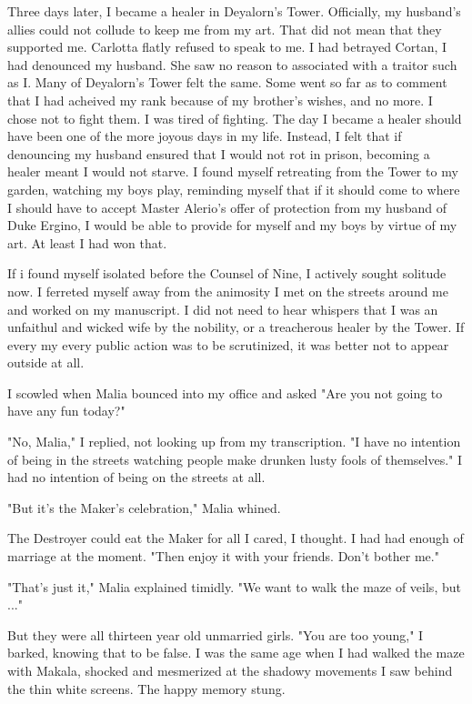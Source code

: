 \documentclass{article}
\begin{document}
Three days later, I became a healer in Deyalorn's Tower. Officially, my husband's allies could not collude to keep me from my art. That did not mean that they supported me. Carlotta flatly refused to speak to me. I had betrayed Cortan, I had denounced my husband. She saw no reason to associated with a traitor such as I. Many of Deyalorn's Tower felt the same. Some went so far as to comment that I had acheived my rank because of my brother's wishes, and no more. I chose not to fight them. I was tired of fighting. The day I became a healer should have been one of the more joyous days in my life. Instead, I felt that if denouncing my husband ensured that I would not rot in prison, becoming a healer meant I would not starve. I found myself retreating from the Tower to my garden, watching my boys play, reminding myself that if it should come to where I should have to accept Master Alerio's offer of protection from my husband of Duke Ergino, I would be able to provide for myself and my boys by virtue of my art. At least I had won that.

If i found myself isolated before the Counsel of Nine, I actively sought solitude now. I ferreted myself away from the animosity I met on the streets around me and worked on my manuscript. I did not need to hear whispers that I was an unfaithul and wicked wife by the nobility, or a treacherous healer by the Tower. If every my every public action was to be scrutinized, it was better not to appear outside at all.

I scowled when Malia bounced into my office and asked "Are you not going to have any fun today?"

"No, Malia," I replied, not looking up from my transcription. "I have no intention of being in the streets watching people make drunken lusty fools of themselves." I had no intention of being on the streets at all.

"But it's the Maker's celebration," Malia whined.

The Destroyer could eat the Maker for all I cared, I thought. I had had enough of marriage at the moment. "Then enjoy it with your friends. Don't bother me." 

"That's just it," Malia explained timidly. "We want to walk the maze of veils, but ..."

But they were all thirteen year old unmarried girls. "You are too young," I barked, knowing that to be false. I was the same age when I had walked the maze with Makala, shocked and mesmerized at the shadowy movements I saw behind the thin white screens. The happy memory stung.
\end{document}
